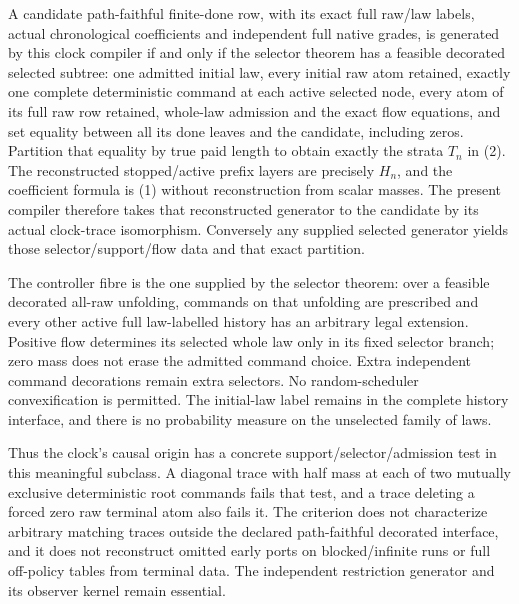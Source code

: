 \documentclass[11pt]{article}\usepackage{amsmath,amssymb,amsthm,geometry}\geometry{margin=1in}\newtheorem{definition}{Definition}\newtheorem{theorem}[definition]{Theorem}\newtheorem{proposition}[definition]{Proposition}
\begin{document}
A candidate path-faithful finite-done row, with its exact full raw/law labels, actual chronological coefficients and independent full native grades, is generated by this clock compiler if and only if the selector theorem has a feasible decorated selected subtree: one admitted initial law, every initial raw atom retained, exactly one complete deterministic command at each active selected node, every atom of its full raw row retained, whole-law admission and the exact flow equations, and set equality between all its done leaves and the candidate, including zeros. Partition that equality by true paid length to obtain exactly the strata $T_n$ in (2). The reconstructed stopped/active prefix layers are precisely $H_n$, and the coefficient formula is (1) without reconstruction from scalar masses. The present compiler therefore takes that reconstructed generator to the candidate by its actual clock-trace isomorphism. Conversely any supplied selected generator yields those selector/support/flow data and that exact partition.

The controller fibre is the one supplied by the selector theorem: over a feasible decorated all-raw unfolding, commands on that unfolding are prescribed and every other active full law-labelled history has an arbitrary legal extension. Positive flow determines its selected whole law only in its fixed selector branch; zero mass does not erase the admitted command choice. Extra independent command decorations remain extra selectors. No random-scheduler convexification is permitted. The initial-law label remains in the complete history interface, and there is no probability measure on the unselected family of laws.

Thus the clock's causal origin has a concrete support/selector/admission test in this meaningful subclass. A diagonal trace with half mass at each of two mutually exclusive deterministic root commands fails that test, and a trace deleting a forced zero raw terminal atom also fails it. The criterion does not characterize arbitrary matching traces outside the declared path-faithful decorated interface, and it does not reconstruct omitted early ports on blocked/infinite runs or full off-policy tables from terminal data. The independent restriction generator and its observer kernel remain essential.
\end{document}
